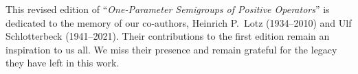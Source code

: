 %
%

\begin{dedication}
{\RaggedRight\Large 
This revised edition of \enquote{\emph{One-Parameter Semigroups of Positive Operators}} is dedicated to the memory 	of our 
co-authors, Heinrich P.~Lotz (1934--2010) and Ulf Schlotterbeck (1941--2021). 
Their contributions to the first edition remain an inspiration to us all. 
We miss their presence and remain grateful for the legacy they have left in this work.}
\end{dedication}




